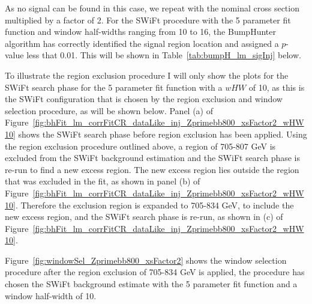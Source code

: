 As no signal can be found in this case, we repeat with the nominal cross section multiplied by a factor of 2.
For the SWiFt procedure with the 5 parameter fit function and window half-widths ranging from 10 to 16,
the {\sc BumpHunter} algorithm has correctly identified the signal region location and assigned a  \mbox{$p$-value} less that 0.01.
This will be shown in Table~\ref{tab:bumpH_lm_sigInj} below.

To illustrate the region exclusion procedure I will only show the plots for the SWiFt search phase for the 5 parameter fit function with a $wHW$ of 10,
as this is the SWiFt configuration that is chosen by the region exclusion and window selection procedure, as will be shown below.
Panel (a) of Figure~\ref{fig:bhFit_lm_corrFitCR_dataLike_inj_Zprimebb800_xsFactor2_wHW10} shows the SWiFt search phase
before region exclusion has been applied.
Using the region exclusion procedure outlined above, a region of 705-807 GeV is excluded from the SWiFt background estimation
and the SWiFt search phase is re-run to find a new excess region.
The new excess region lies outside the region that was excluded in the fit,
as shown in panel (b) of Figure~\ref{fig:bhFit_lm_corrFitCR_dataLike_inj_Zprimebb800_xsFactor2_wHW10}.
Therefore the exclusion region is expanded to 705-834 GeV, to include the new excess region, and the SWiFt search phase is re-run,
as shown in (c) of Figure~\ref{fig:bhFit_lm_corrFitCR_dataLike_inj_Zprimebb800_xsFactor2_wHW10}.

Figure~\ref{fig:windowSel_Zprimebb800_xsFactor2} shows the window selection procedure after the region exclusion of 705-834 GeV is applied,
the procedure has chosen the SWiFt background estimate with the 5 parameter fit function and a window half-width of 10.


